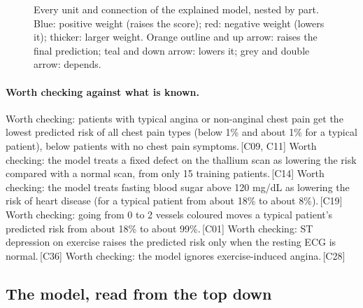 \documentclass[a4paper,10pt]{article}
\newif\ifreviewmarks
\newcommand{\reviewrule}{\noindent{\color{BrickRed}\rule{\linewidth}{0.8pt}}}
\newenvironment{drafted}[1][]{%
  \ifreviewmarks\par\addvspace{\medskipamount}\reviewrule\par\nopagebreak
  \noindent{\color{BrickRed}\sffamily\footnotesize\textbf{Thesis Draft}\quad #1\hfill review}\par\nopagebreak\smallskip\fi}{%
  \ifreviewmarks\par\smallskip\noindent{\color{BrickRed}\sffamily\footnotesize end of thesis draft}\par\nopagebreak\reviewrule\par\medskip\fi}
\begin{document}
\begin{drafted}[plain-language layer: heart-s1-c1]
\begin{landscape}
\begin{figure}[p]
{}%
\caption{Every unit and connection of the explained model, nested by part. Blue: positive weight (raises the score); red: negative weight (lowers it); thicker: larger weight. Orange outline and up arrow: raises the final prediction; teal and down arrow: lowers it; grey and double arrow: depends.}
\label{fig:hearts1c1:overview}
\end{figure}
\end{landscape}
\paragraph{Worth checking against what is known.} Worth checking: patients with typical angina or non-anginal chest pain get the lowest predicted risk of all chest pain types (below 1\% and about 1\% for a typical patient), below patients with no chest pain symptoms.\,{\scriptsize\textcolor{NavyBlue}{[C09, C11]}} Worth checking: the model treats a fixed defect on the thallium scan as lowering the risk compared with a normal scan, from only 15 training patients.\,{\scriptsize\textcolor{NavyBlue}{[C14]}} Worth checking: the model treats fasting blood sugar above 120 mg/dL as lowering the risk of heart disease (for a typical patient from about 18\% to about 8\%).\,{\scriptsize\textcolor{NavyBlue}{[C19]}} Worth checking: going from 0 to 2 vessels coloured moves a typical patient's predicted risk from about 18\% to about 99\%.\,{\scriptsize\textcolor{NavyBlue}{[C01]}} Worth checking: ST depression on exercise raises the predicted risk only when the resting ECG is normal.\,{\scriptsize\textcolor{NavyBlue}{[C36]}} Worth checking: the model ignores exercise-induced angina.\,{\scriptsize\textcolor{NavyBlue}{[C28]}}
\subsection{The model, read from the top down}

\end{drafted}
\end{document}

